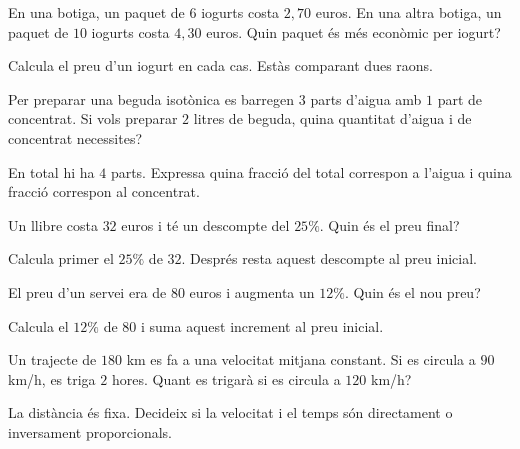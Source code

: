 \begin{exercici}
	En una botiga, un paquet de \(6\) iogurts costa \(2{,}70\) euros. En una altra botiga, un paquet de \(10\) iogurts costa \(4{,}30\) euros. Quin paquet és més econòmic per iogurt?
\end{exercici}

\begin{indicacio}
	Calcula el preu d'un iogurt en cada cas. Estàs comparant dues raons.
\end{indicacio}

\begin{exercici}[Mescla]
	Per preparar una beguda isotònica es barregen \(3\) parts d'aigua amb \(1\) part de concentrat. Si vols preparar \(2\) litres de beguda, quina quantitat d'aigua i de concentrat necessites?
\end{exercici}

\begin{indicacio}
	En total hi ha \(4\) parts. Expressa quina fracció del total correspon a l'aigua i quina fracció correspon al concentrat.
\end{indicacio}

\begin{exercici}
	Un llibre costa \(32\) euros i té un descompte del \(25\%\). Quin és el preu final?
\end{exercici}

\begin{indicacio}
	Calcula primer el \(25\%\) de \(32\). Després resta aquest descompte al preu inicial.
\end{indicacio}

\begin{exercici}
	El preu d'un servei era de \(80\) euros i augmenta un \(12\%\). Quin és el nou preu?
\end{exercici}

\begin{indicacio}
	Calcula el \(12\%\) de \(80\) i suma aquest increment al preu inicial.
\end{indicacio}

\begin{exercici}
	Un trajecte de \(180\) km es fa a una velocitat mitjana constant. Si es circula a \(90\) km/h, es triga \(2\) hores. Quant es trigarà si es circula a \(120\) km/h?
\end{exercici}

\begin{indicacio}
	La distància és fixa. Decideix si la velocitat i el temps són directament o inversament proporcionals.
\end{indicacio}

